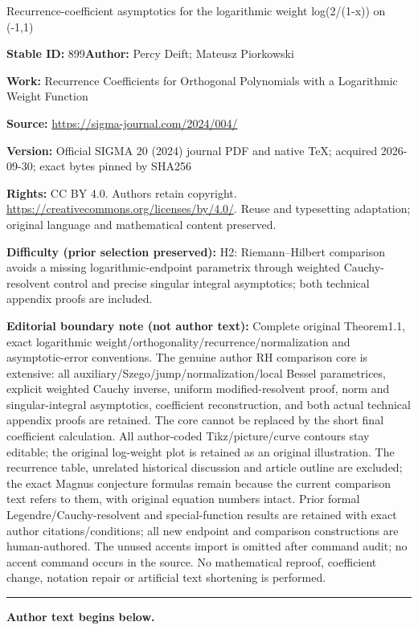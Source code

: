 \documentclass[11pt]{article}
\numberwithin{equation}{section}
\numberwithin{equation}{section}
\begin{document}
\begin{center}\Large Recurrence-coefficient asymptotics for the logarithmic weight log(2/(1-x)) on (-1,1)\end{center}
\noindent\textbf{Stable ID:} 899\quad\textbf{Author:} Percy Deift; Mateusz Piorkowski\par
\noindent\textbf{Work:} Recurrence Coefficients for Orthogonal Polynomials with a Logarithmic Weight Function\par
\noindent\textbf{Source:} \url{https://sigma-journal.com/2024/004/}\par
\noindent\textbf{Version:} Official SIGMA 20 (2024) journal PDF and native TeX; acquired 2026-09-30; exact bytes pinned by SHA256\par
\noindent\textbf{Rights:} CC BY 4.0. Authors retain copyright. \url{https://creativecommons.org/licenses/by/4.0/}. Reuse and typesetting adaptation; original language and mathematical content preserved.\par
\noindent\textbf{Difficulty (prior selection preserved):} {\CJKfont H2: Riemann–Hilbert comparison avoids a missing logarithmic-endpoint parametrix through weighted Cauchy-resolvent control and precise singular integral asymptotics; both technical appendix proofs are included.}\par
\medskip\noindent\textbf{Editorial boundary note (not author text):} Complete original Theorem1.1, exact logarithmic weight/orthogonality/recurrence/normalization and asymptotic-error conventions. The genuine author RH comparison core is extensive: all auxiliary/Szego/jump/normalization/local Bessel parametrices, explicit weighted Cauchy inverse, uniform modified-resolvent proof, norm and singular-integral asymptotics, coefficient reconstruction, and both actual technical appendix proofs are retained. The core cannot be replaced by the short final coefficient calculation. All author-coded Tikz/picture/curve contours stay editable; the original log-weight plot is retained as an original illustration. The recurrence table, unrelated historical discussion and article outline are excluded; the exact Magnus conjecture formulas remain because the current comparison text refers to them, with original equation numbers intact. Prior formal Legendre/Cauchy-resolvent and special-function results are retained with exact author citations/conditions; all new endpoint and comparison constructions are human-authored. The unused accents import is omitted after command audit; no accent command occurs in the source. No mathematical reproof, coefficient change, notation repair or artificial text shortening is performed.\par
\medskip\hrule\medskip\noindent\textbf{Author text begins below.}\par
\end{document}
